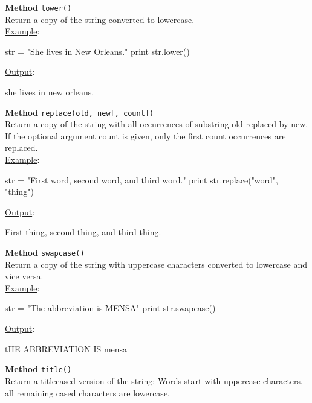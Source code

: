 \noindent
{\bf Method} {\tt lower()}\\

\noindent
Return a copy of the string converted to lowercase.\\

\noindent
\underline{Example}:
\begin{bluecode}
str = "She lives in New Orleans."
print str.lower()
\end{bluecode}
\underline{Output}:
\begin{greencode}
she lives in new orleans.
\end{greencode}
\vspace{4mm}

\noindent
{\bf Method} {\tt replace(old, new[, count])}\\

\noindent
Return a copy of the string with all occurrences of substring old replaced by new. 
If the optional argument count is given, only the first count occurrences are replaced.\\

\noindent
\underline{Example}:
\begin{bluecode}
str = "First word, second word, and third word."
print str.replace("word", "thing")
\end{bluecode}
\underline{Output}:
\begin{greencode}
First thing, second thing, and third thing.
\end{greencode}
\vspace{4mm}

\noindent
{\bf Method} {\tt swapcase()}\\

\noindent
Return a copy of the string with uppercase characters converted to lowercase and vice versa.\\

\noindent
\underline{Example}:
\begin{bluecode}
str = "The abbreviation is MENSA"
print str.swapcase()
\end{bluecode}
\underline{Output}:
\begin{greencode}
tHE ABBREVIATION IS mensa
\end{greencode}
\vspace{4mm}

\noindent
{\bf Method} {\tt title()}\\

\noindent
Return a titlecased version of the string: Words start with uppercase characters, 
all remaining cased characters are lowercase.\\

